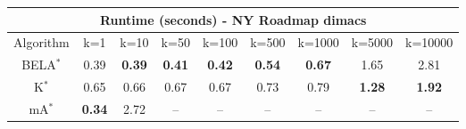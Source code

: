 \begin{tabular}{c|cccccccc}\toprule
\multicolumn{9}{c}{Runtime (seconds) - NY Roadmap dimacs}\\ \midrule
Algorithm & k=1 & k=10 & k=50 & k=100 & k=500 & k=1000 & k=5000 & k=10000 \\ \midrule
BELA$^*$ & 0.39 & \textbf{0.39} & \textbf{0.41} & \textbf{0.42} & \textbf{0.54} & \textbf{0.67} & 1.65 & 2.81 \\
K$^*$ & 0.65 & 0.66 & 0.67 & 0.67 & 0.73 & 0.79 & \textbf{1.28} & \textbf{1.92} \\
mA$^*$ & \textbf{0.34} & 2.72 & -- & -- & -- & -- & -- & -- \\ \bottomrule 
\end{tabular}
